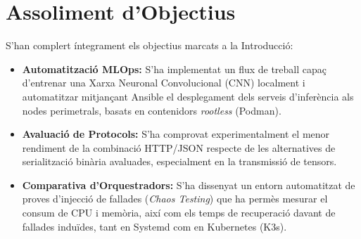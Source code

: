 %

\section{Assoliment d'Objectius}
S'han complert íntegrament els objectius marcats a la Introducció:
\begin{itemize}
    \item \textbf{Automatització MLOps:} S'ha implementat un flux de treball capaç d'entrenar una Xarxa Neuronal Convolucional (CNN) localment i automatitzar mitjançant Ansible el desplegament dels serveis d'inferència als nodes perimetrals, basats en contenidors \textit{rootless} (Podman).
    \item \textbf{Avaluació de Protocols:} S'ha comprovat experimentalment el menor rendiment de la combinació HTTP/JSON respecte de les alternatives de serialització binària avaluades, especialment en la transmissió de tensors.
    \item \textbf{Comparativa d'Orquestradors:} S'ha dissenyat un entorn automatitzat de proves d'injecció de fallades (\textit{Chaos Testing}) que ha permès mesurar el consum de CPU i memòria, així com els temps de recuperació davant de fallades induïdes, tant en Systemd com en Kubernetes (K3s).
\end{itemize}


